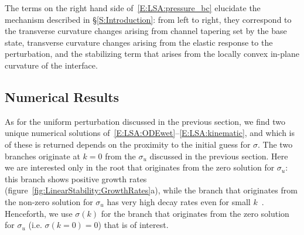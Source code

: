 \documentclass{jfm}
\begin{document}
The terms on the right hand side of~\eqref{E:LSA:pressure_bc} elucidate the mechanism described in \S\ref{S:Introduction}: from left to right, they correspond to the transverse curvature changes arising from channel tapering set by the base state, transverse curvature changes arising from the elastic response to the perturbation, and the stabilizing term that arises from the locally convex in-plane curvature of the interface.


\subsection{Numerical Results}
As for the uniform perturbation discussed in the previous section, we find two unique numerical solutions of~\eqref{E:LSA:ODEwet}--\eqref{E:LSA:kinematic}, and which is of these is returned depends on the proximity to the initial guess for $\sigma$. The two branches originate at $k =0$ from the $\sigma_u$ discussed in the previous section. Here we are interested only in the root that originates from the zero solution for $\sigma_u$: this branch shows positive growth rates (figure~\ref{fig:LinearStability:GrowthRates}a), while the branch that originates from the non-zero solution for $\sigma_u$ has very high decay rates even for small $k$~\citep[not shown, see][]{BradleyPhDthesis}. Henceforth, we use $\sigma(k)$ for the branch that originates from the zero solution for $\sigma_u$ (i.e. $\sigma(k=0) = 0$) that is of interest.



\end{document}
